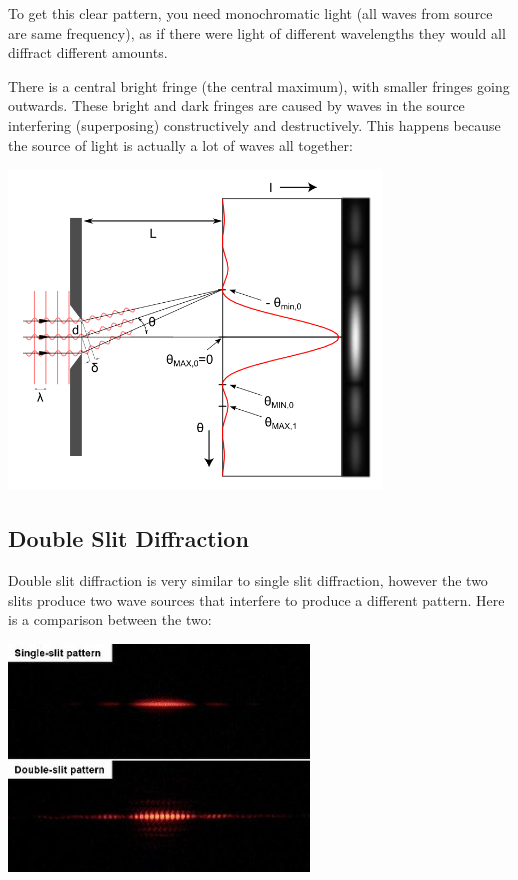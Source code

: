 \documentclass[a4paper, 12pt]{article}
\begin{document}
To get this clear pattern, you need monochromatic light (all waves from source are same frequency), as if there were light of different wavelengths they would all diffract different amounts.

There is a central bright fringe (the central maximum), with smaller fringes going outwards. These bright and dark fringes are caused by waves in the source interfering (superposing) constructively and destructively. This happens because the source of light is actually a lot of waves all together:

\begin{center}
\includegraphics[height=8.5cm]{images/singleSlit.png}
\end{center}

\subsection{Double Slit Diffraction}

Double slit diffraction is very similar to single slit diffraction, however the two slits produce two wave sources that interfere to produce a different pattern. Here is a comparison between the two:

\begin{center}
\includegraphics[width=0.6\textwidth]{images/slitDIffCompare.jpg}
\end{center}
\end{document}
